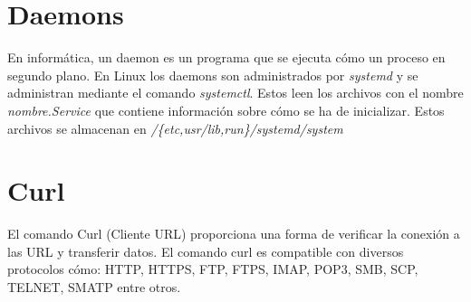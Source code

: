 \section{Daemons}

En informática, un daemon es un programa que se ejecuta cómo un proceso en segundo plano.
En Linux los daemons son administrados por \textit{systemd} y se administran mediante el comando \textit{systemctl}. Estos leen los archivos con el nombre \textit{nombre.Service} que contiene información sobre cómo se ha de inicializar. Estos archivos se almacenan en \textit{/\{etc,usr/lib,run\}/systemd/system}\cite{pagina:daemons_linux}


\section{Curl}

El comando Curl (Cliente URL) proporciona una forma de verificar la conexión a las URL y transferir datos. El comando curl es compatible con diversos protocolos cómo: HTTP, HTTPS, FTP, FTPS, IMAP, POP3, SMB, SCP, TELNET, SMATP entre otros.\cite{pagina:Curl}


